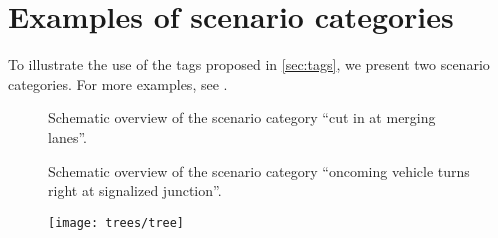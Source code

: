 \section{Examples of scenario categories}
\label{sec:examples}

To illustrate the use of the tags proposed in \cref{sec:tags}, we present two scenario categories. For more examples, see \autocite{degelder2019scenariocategories}.

\setlength{\figurewidth}{22.5em}
\begin{figure}
	\centering
	
	\caption{Schematic overview of the scenario category ``cut in at merging lanes''.}
	\label{fig:scheme cut in}
\end{figure}


\setlength{\figurewidth}{15.0em}
\begin{figure}
	\centering
	
	\caption{Schematic overview of the scenario category ``oncoming vehicle turns right at signalized junction''.}
	\label{fig:scheme traffic light}
\end{figure}

\begin{figure}
	\centering
	\texttt{[image: trees/tree]}
\end{figure}